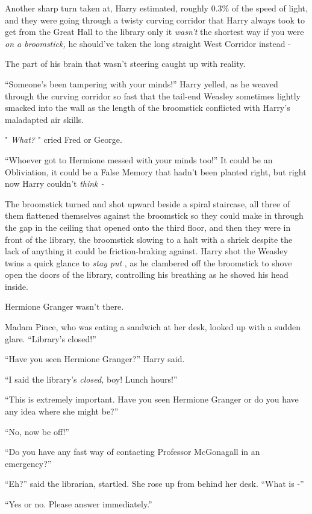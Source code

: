 Another sharp turn taken at, Harry estimated, roughly 0.3\% of the speed
of light, and they were going through a twisty curving corridor that
Harry always took to get from the Great Hall to the library only it
\emph{wasn't} the shortest way if you were \emph{on a broomstick,} he
should've taken the long straight West Corridor instead -

The part of his brain that wasn't steering caught up with reality.

``Someone's been tampering with your minds!'' Harry yelled, as he weaved
through the curving corridor so fast that the tail-end Weasley sometimes
lightly smacked into the wall as the length of the broomstick conflicted
with Harry's maladapted air skills.

" \emph{What?} " cried Fred or George.

``Whoever got to Hermione messed with your minds too!'' It could be an
Obliviation, it could be a False Memory that hadn't been planted right,
but right now Harry couldn't \emph{think -}

The broomstick turned and shot upward beside a spiral staircase, all
three of them flattened themselves against the broomstick so they could
make in through the gap in the ceiling that opened onto the third floor,
and then they were in front of the library, the broomstick slowing to a
halt with a shriek despite the lack of anything it could be
friction-braking against. Harry shot the Weasley twins a quick glance to
\emph{stay put} , as he clambered off the broomstick to shove open the
doors of the library, controlling his breathing as he shoved his head
inside.

Hermione Granger wasn't there.

Madam Pince, who was eating a sandwich at her desk, looked up with a
sudden glare. ``Library's closed!''

``Have you seen Hermione Granger?'' Harry said.

``I said the library's \emph{closed,} boy! Lunch hours!''

``This is extremely important. Have you seen Hermione Granger or do you
have any idea where she might be?''

``No, now be off!''

``Do you have any fast way of contacting Professor McGonagall in an
emergency?''

``Eh?'' said the librarian, startled. She rose up from behind her desk.
``What is -''

``Yes or no. Please answer immediately.''

